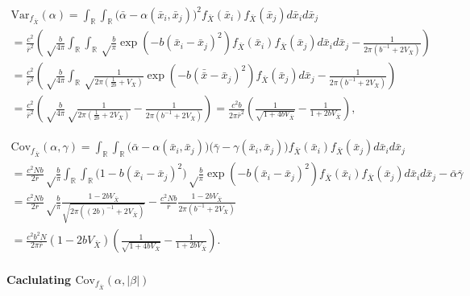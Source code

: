 \documentclass[]{article}
\let\oldparagraph\paragraph
\renewcommand{\paragraph}[1]{\oldparagraph{#1}\mbox{}}
\begin{document}
\begin{multline}
\mathrm{Var}_{f_{\bar X}}(\alpha)=
\int_\mathbb{R}\int_\mathbb{R}\big(\bar\alpha-\alpha(\bar x_i,\bar x_j)\big)^2f_{\bar X}(\bar x_i)f_{\bar X}(\bar x_j)d\bar x_id\bar x_j \\
=\frac{c^2}{\bar r^2}\left(\sqrt\frac{b}{4\pi}\int_\mathbb{R}\int_\mathbb{R}\sqrt\frac{b}{\pi}\exp\left(-b(\bar x_i-\bar x_j)^2\right)f_{\bar X}(\bar x_i)f_{\bar X}(\bar x_j)d\bar x_id\bar x_j-\frac{1}{2\pi(b^{-1}+2V_{\bar X})}\right) \\
=\frac{c^2}{\bar r^2}\left(\sqrt\frac{b}{4\pi}\int_\mathbb{R}\sqrt\frac{1}{2\pi(\frac{1}{2b}+V_{\bar X})}\exp\left(-b(\bar{\bar x}-\bar x_j)^2\right)f_{\bar X}(\bar x_j)d\bar x_j-\frac{1}{2\pi(b^{-1}+2V_{\bar X})}\right) \\
=\frac{c^2}{\bar r^2}\left(\sqrt\frac{b}{4\pi}\sqrt\frac{1}{2\pi(\frac{1}{2b}+2V_{\bar X})}-\frac{1}{2\pi(b^{-1}+2V_{\bar X})}\right)=\frac{c^2b}{2\pi\bar r^2}\left(\frac{1}{\sqrt{1+4bV_{\bar X}}}-\frac{1}{1+2bV_{\bar X}}\right),
\end{multline}

\begin{multline}
\mathrm{Cov}_{f_{\bar X}}(\alpha,\gamma)=
\int_\mathbb{R}\int_\mathbb{R}\big(\bar\alpha-\alpha(\bar x_i,\bar x_j)\big)\big(\bar\gamma-\gamma(\bar x_i,\bar x_j)\big)f_{\bar X}(\bar x_i)f_{\bar X}(\bar x_j)d\bar x_id\bar x_j \\
=\frac{c^2Nb}{2\bar r}\sqrt\frac{b}{\pi}\int_\mathbb{R}\int_\mathbb{R}\big(1-b(\bar x_i-\bar x_j)^2\big)\sqrt\frac{b}{\pi}\exp\left(-b(\bar x_i-\bar x_j)^2\right)f_{\bar X}(\bar x_i)f_{\bar X}(\bar x_j)d\bar x_id\bar x_j-\bar\alpha\bar\gamma \\
=\frac{c^2Nb}{2\bar r}\sqrt\frac{b}{\pi}\frac{1-2bV_{\bar X}}{\sqrt{2\pi((2b)^{-1}+2V_{\bar X})}}-\frac{c^2Nb}{\bar r}\frac{1-2bV_{\bar X}}{2\pi(b^{-1}+2V_{\bar X})} \\
=\frac{c^2b^2N}{2\pi\bar r}(1-2bV_{\bar X})\left(\frac{1}{\sqrt{1+4bV_{\bar X}}}-\frac{1}{1+2bV_{\bar X}}\right).
\end{multline}

\hypertarget{caclulating-mathrmcov_f_bar-xalphabeta}{%
\paragraph{\texorpdfstring{Caclulating
\(\mathrm{Cov}_{f_{\bar X}}(\alpha,|\beta|)\)}{Caclulating \textbackslash{}mathrm\{Cov\}\_\{f\_\{\textbackslash{}bar X\}\}(\textbackslash{}alpha,\textbar{}\textbackslash{}beta\textbar{})}}\label{caclulating-mathrmcov_f_bar-xalphabeta}}
\end{document}

